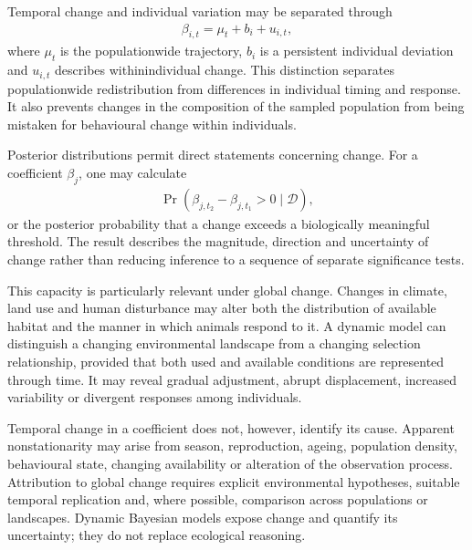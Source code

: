 \documentclass[letterpaper,10pt,english]{sphinxmanual}
\begin{document}
\sphinxAtStartPar
Temporal change and individual variation may be separated through
\begin{equation*}
\begin{split}
\beta_{i,t}
=
\mu_t
+
b_i
+
u_{i,t},
\end{split}
\end{equation*}
\sphinxAtStartPar
where \(\mu_t\) is the population\sphinxhyphen{}wide trajectory, \(b_i\) is a persistent individual deviation and \(u_{i,t}\) describes within\sphinxhyphen{}individual change. This distinction separates population\sphinxhyphen{}wide redistribution from differences in individual timing and response. It also prevents changes in the composition of the sampled population from being mistaken for behavioural change within individuals.

\sphinxAtStartPar
Posterior distributions permit direct statements concerning change. For a coefficient \(\beta_j\), one may calculate
\begin{equation*}
\begin{split}
\Pr
\left(
\beta_{j,t_2}
-
\beta_{j,t_1}
>
0
\mid
\mathcal{D}
\right),
\end{split}
\end{equation*}
\sphinxAtStartPar
or the posterior probability that a change exceeds a biologically meaningful threshold. The result describes the magnitude, direction and uncertainty of change rather than reducing inference to a sequence of separate significance tests.

\sphinxAtStartPar
This capacity is particularly relevant under global change. Changes in climate, land use and human disturbance may alter both the distribution of available habitat and the manner in which animals respond to it. A dynamic model can distinguish a changing environmental landscape from a changing selection relationship, provided that both used and available conditions are represented through time. It may reveal gradual adjustment, abrupt displacement, increased variability or divergent responses among individuals.

\sphinxAtStartPar
Temporal change in a coefficient does not, however, identify its cause. Apparent non\sphinxhyphen{}stationarity may arise from season, reproduction, ageing, population density, behavioural state, changing availability or alteration of the observation process. Attribution to global change requires explicit environmental hypotheses, suitable temporal replication and, where possible, comparison across populations or landscapes. Dynamic Bayesian models expose change and quantify its uncertainty; they do not replace ecological reasoning.
\end{document}
